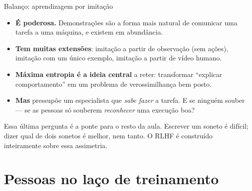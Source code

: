 \documentclass[aspectratio=169, 11pt]{beamer}
\begin{document}
\begin{frame}{Balanço: aprendizagem por imitação}

  \begin{itemize}\setlength{\itemsep}{0.4ex}
    \item \textbf{É poderosa.} Demonstrações são a forma mais natural de
      comunicar uma tarefa a uma máquina, e existem em abundância.
    \item \textbf{Tem muitas extensões}: imitação a partir de observação (sem
      ações), imitação com um único exemplo, imitação a partir de vídeo humano.
    \item \textbf{Máxima entropia é a ideia central} a reter: transformar
      ``explicar comportamento'' em um problema de verossimilhança bem posto.
    \item \textbf{Mas} pressupõe um especialista que \emph{sabe fazer} a tarefa.
      E se ninguém souber --- se as pessoas só souberem \emph{reconhecer} uma
      execução boa?
  \end{itemize}

  \begin{ideiabox}
    Essa última pergunta é a ponte para o resto da aula. Escrever um soneto é
    difícil; dizer qual de dois sonetos é melhor, nem tanto. O RLHF é construído
    inteiramente sobre essa assimetria.
  \end{ideiabox}
\end{frame}

\section{Pessoas no laço de treinamento}
\end{document}

